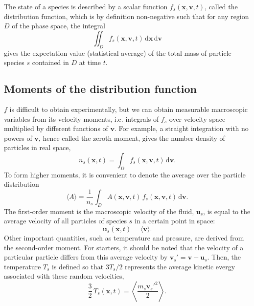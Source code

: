 \documentclass[12pt]{article}
\begin{document}
The state of a species is described by a scalar function $f_s(\bm{x}, \bm{v}, t)$, called the distribution function, which is by definition non-negative such that for any region $D$ of the phase space, the integral
%
\begin{equation}
    \iint_D f_s(\bm{x}, \bm{v}, t) \, \mathrm{d}\bm{x} \, \mathrm{d}\bm{v}
\end{equation}
%
gives the expectation value (statistical average) of the total mass of particle species $s$ contained in $D$ at time $t$.

\subsection{Moments of the distribution function}

$f$ is difficult to obtain experimentally, but we can obtain measurable macroscopic variables from its velocity moments, i.e. integrals of $f_s$ over velocity space multiplied by different functions of $\bm{v}$. For example, a straight integration with no powers of $\bm{v}$, hence called the zeroth moment, gives the number density of particles in real space,
%
\begin{equation}
    n_s(\bm{x}, t) = \int_D f_s(\bm{x}, \bm{v}, t) \, \mathrm{d}\bm{v} .
\end{equation}
%
To form higher moments, it is convenient to denote the average over the particle distribution
%
\begin{equation}
    \langle A \rangle = \frac{1}{n_s} \int_D A(\bm{x}, \bm{v}, t) \, f_s(\bm{x}, \bm{v}, t) \, \mathrm{d}\bm{v} .
\end{equation}
%
The first-order moment is the macroscopic velocity of the fluid, $\bm{u}_s$, is equal to the average velocity of all particles of species $s$ in a certain point in space:
%
\begin{equation}
    \bm{u}_s(\bm{x}, t) = \langle \bm{v} \rangle .
\end{equation}
%
Other important quantities, such as temperature and pressure, are derived from the second-order moment. For starters, it should be noted that the velocity of a particular particle differs from this average velocity by $\bm{v}_s' = \bm{v} - \bm{u}_s$. Then, the temperature $T_s$ is defined so that $3T_s/2$ represents the average kinetic evergy associated with these random velocities,
%
\begin{equation}
    \frac{3}{2} \, T_s(\bm{x}, t) = \left\langle \frac{m_s \bm{v}_s'^2}{2} \right\rangle .
\end{equation}
\end{document}
